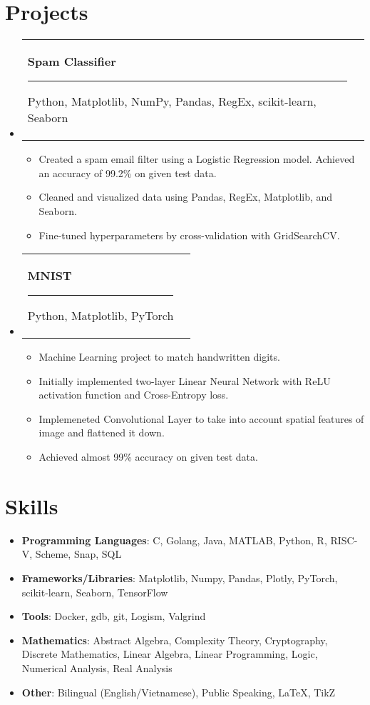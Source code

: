 \documentclass[letterpaper,11pt]{article}
\makeatletter
\newcommand{\resumeItem}[2]{
	\item\small{
		\textbf{#1}{: #2 \vspace{-2pt}}
	}
}
\newcommand{\resumeItemTwo}[1]{
	\item\small{
		#1 \vspace{-2pt}}
}
\newcommand{\resumeSubheadingTwo}[2]{
	\vspace{-1pt}\item
	\begin{tabular*}{0.97\textwidth}[t]{l@{\extracolsep{\fill}}r}
		\textbf{#1} \rule[-0.4ex]{0.1ex}{1.2em} #2 \\
	\end{tabular*}\vspace{-5pt}
}
\newcommand{\resumeSubItem}[2]{\resumeItem{#1}{#2}\vspace{-4pt}}
\newcommand{\resumeSubHeadingListStart}{\begin{itemize}[leftmargin=*]}
\newcommand{\resumeSubHeadingListEnd}{\end{itemize}}
\newcommand{\resumeItemListStart}{\begin{itemize}}
\newcommand{\resumeItemListEnd}{\end{itemize}\vspace{-5pt}}
\makeatother
\begin{document}
	\section{Projects}
	\resumeSubHeadingListStart
	
	\resumeSubheadingTwo
	{Spam Classifier}{Python, Matplotlib, NumPy, Pandas, RegEx, scikit-learn, Seaborn}
	\resumeItemListStart
	\resumeItemTwo{Created a spam email filter using a Logistic Regression model. Achieved an accuracy of 99.2\% on given test data.}
	\resumeItemTwo{Cleaned and visualized data using Pandas, RegEx, Matplotlib, and Seaborn.}
	\resumeItemTwo{Fine-tuned hyperparameters by cross-validation with GridSearchCV.}
	\resumeItemListEnd
	
	\resumeSubheadingTwo
	{MNIST}{Python, Matplotlib, PyTorch}
	\resumeItemListStart
	\resumeItemTwo{Machine Learning project to match handwritten digits.}
	\resumeItemTwo{Initially implemented two-layer Linear Neural Network with ReLU activation function and Cross-Entropy loss.}
	\resumeItemTwo{Implemeneted Convolutional Layer to take into account spatial features of image and flattened it down.}
	\resumeItemTwo{Achieved almost 99\% accuracy on given test data.}
	\resumeItemListEnd
	\resumeSubHeadingListEnd

	\section{Skills}
	\resumeSubHeadingListStart
	\resumeSubItem{Programming Languages}
	{C, Golang, Java, MATLAB, Python, R, RISC-V, Scheme, Snap, SQL}
	\resumeSubItem{Frameworks/Libraries}{Matplotlib, Numpy, Pandas, Plotly, PyTorch, scikit-learn, Seaborn, TensorFlow}
	\resumeSubItem{Tools}{Docker, gdb, git, Logism, Valgrind}
	\resumeSubItem{Mathematics}{Abstract Algebra, Complexity Theory, Cryptography, Discrete Mathematics, Linear Algebra, Linear Programming, Logic, Numerical Analysis, Real Analysis}
	\resumeItem{Other}{Bilingual (English/Vietnamese), Public Speaking, LaTeX, TikZ}
	\resumeSubHeadingListEnd
\end{document}
